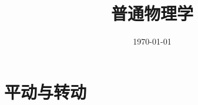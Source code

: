 \documentclass{article}
\title{普通物理学}
\author{}
\date{\today}
\begin{document}
\hypersetup{
    hidelinks,
    allcolors = black,
    breaklinks = true
}

\newtheorem{definition}{Definition}[subsection]
\newtheorem{theorem}{Theorem}[subsection]
\newtheorem{corollary}{Corollary}[theorem]
\renewcommand{\proofname}{\indent\bf Proof}

\def\e{\mathrm e}
\def\i{\mathrm i}
\def\j{\mathrm j}
\def\d{\mathrm d}
\def\C{\mathrm C}
\def\div{\mathrm{div}}
\def\rot{\mathrm{rot}}
\def\vecv{\vec{\mathrm v}}
\def\sr{\mathbb R}
\def\sn{\mathbb N}
\def\snp{\mathbb N^+}
\def\sc{\mathbb C}
\def\sz{\mathbb Z}
\def\impint{\int\limits_{-\infty}^{+\infty}}

\newcommand{\abs}[1]{\left|#1\right|}
\newcommand{\pare}[1]{\left(#1\right)}
\newcommand{\fourier}[1]{\mathscr F\pare{#1}}
\newcommand{\tfourier}[1]{\mathscr F^{-1}\pare{#1}}
\newcommand{\jacobi}[2]{\frac{\partial\pare{#1}}{\partial\pare{#2}}}

\begin{titlepage}
    \maketitle
\end{titlepage}

\tableofcontents
\newpage

\part{平动与转动}
\end{document}
